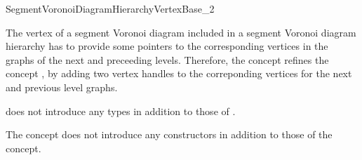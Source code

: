 

\begin{ccRefConcept}{SegmentVoronoiDiagramHierarchyVertexBase_2}



\ccDefinition 
The vertex of a segment Voronoi diagram
included in a segment Voronoi diagram hierarchy has to provide
some pointers to the corresponding vertices in the
graphs of the next and preceeding levels.
Therefore, the concept 
refines the concept , by
adding two vertex handles to the correponding vertices for the
next and previous level graphs.


\ccRefines
{}


\ccTypes
{} does not introduce
any types in addition to those of
.


\ccCreation
{}  %
%

The  concept does not
introduce any constructors in addition to those of the
 concept.





\end{ccRefConcept}
